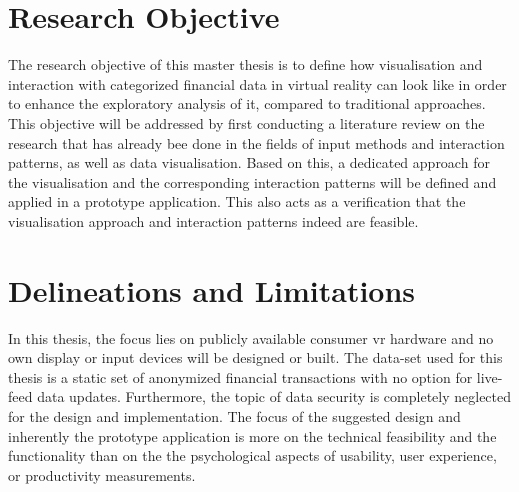
\section{Research Objective}

The research objective of this master thesis is to define how visualisation and interaction with categorized financial data in virtual reality can look like in order to enhance the exploratory analysis of it, compared to traditional approaches. \newline
This objective will be addressed by first conducting a literature review on the research that has already bee done in the fields of input methods and interaction patterns, as well as data visualisation. Based on this, a dedicated approach for the visualisation and the corresponding interaction patterns will be defined and applied in a prototype application. This also acts as a verification that the visualisation approach and interaction patterns indeed are feasible.






\section{Delineations and Limitations}

In this thesis, the focus lies on publicly available consumer \gls{vr} hardware and no own display or input devices will be designed or built. The data-set used for this thesis is a static set of anonymized financial transactions with no option for live-feed data updates. Furthermore, the topic of data security is completely neglected for the design and implementation. The focus of the suggested design and inherently the prototype application is more on the technical feasibility and the functionality than on the the psychological aspects of usability, user experience, or productivity measurements. 


